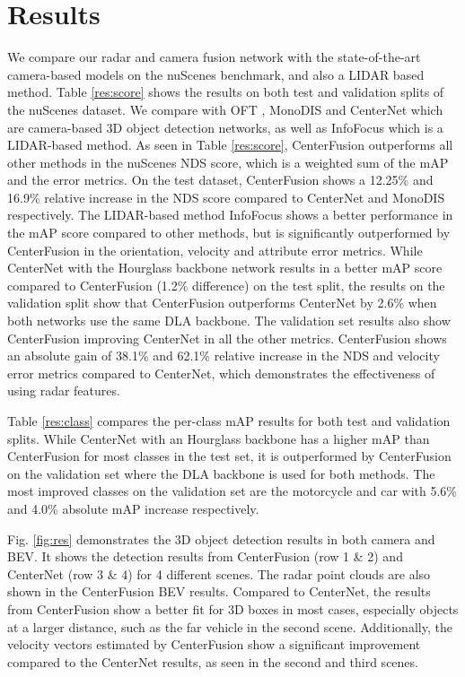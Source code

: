 \documentclass[10pt,twocolumn,letterpaper]{article}
\begin{document}
   \section{Results}
   We compare our radar and camera fusion network with the state-of-the-art camera-based
   models on the nuScenes benchmark, and also a LIDAR based method. 
   Table \ref{res:score} shows the results
   on both test and validation splits of the nuScenes dataset. We compare 
   with OFT \cite{roddick2018orthographic}, MonoDIS \cite{simonelli2019a} and
   CenterNet \cite{zhou2019objects}
   which are camera-based 3D object detection networks, as well as InfoFocus
   \cite{wang2020infofocus} which is a LIDAR-based method. As seen in 
   Table \ref{res:score}, CenterFusion outperforms 
   all other methods in the nuScenes NDS score, which is a weighted sum of the 
   mAP and the error metrics.
   On the test dataset, CenterFusion 
   shows a 12.25\% and 16.9\% relative increase in the NDS score compared to CenterNet and 
   MonoDIS respectively. The LIDAR-based method InfoFocus shows a better 
   performance in the mAP score compared to other methods, but is significantly 
   outperformed by CenterFusion 
   in the orientation, velocity and attribute error metrics. While CenterNet with the 
   Hourglass \cite{newellHourglass2016a} backbone network results in a better
   mAP score compared to CenterFusion (1.2\% difference) on the test split, 
   the results on the 
   validation split show that CenterFusion outperforms CenterNet by 2.6\% when 
   both networks use the same DLA \cite{yuDeepLayerAggregation2018} backbone.
   The validation set results also show CenterFusion 
   improving CenterNet in all the other metrics. CenterFusion shows an absolute 
   gain of 38.1\% and 62.1\% relative increase in the NDS 
   and velocity error metrics compared to CenterNet, which demonstrates the 
   effectiveness of using radar features.
   
   Table \ref{res:class} compares the per-class mAP results for both 
   test and validation splits. While CenterNet with an Hourglass backbone has a 
   higher mAP than CenterFusion for most classes in the test set, it is 
   outperformed by CenterFusion on the validation set where
   the DLA backbone is used for both methods. The most improved classes 
   on the validation set are the motorcycle and car with 5.6\% and 4.0\% absolute 
   mAP increase respectively.
   
   Fig. \ref{fig:res} demonstrates the 3D object detection results in both camera
   and BEV. It shows the detection results from CenterFusion (row 1 \& 2) and 
   CenterNet (row 3 \& 4) for 4 different scenes. The radar point clouds are 
   also shown in the CenterFusion BEV results.
   Compared to CenterNet, the results from CenterFusion show 
   a better fit for 3D boxes in most cases, especially objects at a larger distance, 
   such as the far vehicle in the second scene. 
   Additionally, the velocity vectors estimated by CenterFusion show a 
   significant improvement compared to the CenterNet results, as seen 
   in the second and third scenes.
   
\end{document}
